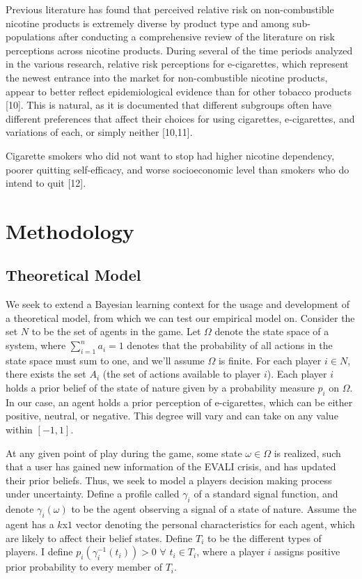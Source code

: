 \documentclass[12pt]{article}
\begin{document}
Previous literature has found that perceived relative risk on non-combustible nicotine products is extremely diverse by product type and among sub-populations after conducting a comprehensive review of the literature on risk perceptions across nicotine products. During several of the time periods analyzed in the various research, relative risk perceptions for e-cigarettes, which represent the newest entrance into the market for non-combustible nicotine products, appear to better reflect epidemiological evidence than for other tobacco products [10]. This is natural, as it is documented that different subgroups often have different preferences that affect their choices for using cigarettes, e-cigarettes, and variations of each, or simply neither [10,11].

Cigarette smokers who did not want to stop had higher nicotine dependency, poorer quitting self-efficacy, and worse socioeconomic level than smokers who do intend to quit [12].



\section{Methodology} \label{sec:methodology}


\subsection{Theoretical Model}
\hspace{5mm}We seek to extend a Bayesian learning context for the usage and development of a theoretical model, from which we can test our empirical model on. Consider the set $N$ to be the set of agents in the game. Let $\Omega$ denote the state space of a system, where $\sum\limits_{i=1}^{n}a_i=1$ denotes that the probability of all actions in the state space must sum to one, and we'll assume $\Omega$ is finite. For each player $i\in N$, there exists the set $A_i$ (the set of actions available to player $i$). Each player $i$ holds a prior belief of the state of nature given by a probability measure $p_i$ on $\Omega$. In our case, an agent holds a prior perception of e-cigarettes, which can be either positive, neutral, or negative. This degree will vary and can take on any value within $[-1,1]$. 

At any given point of play during the game, some state $\omega\in\Omega$ is realized, such that a user has gained new information of the EVALI crisis, and has updated their prior beliefs. Thus, we seek to model a players decision making process under uncertainty. Define a profile called $\gamma_i$ of a standard signal function, and denote $\gamma_i(\omega)$ to be the agent observing a signal of a state of nature. Assume the agent has a $k$x$1$ vector denoting the personal characteristics for each agent, which are likely to affect their belief states. Define $T_i$ to be the different types of players. I define $p_i(\gamma_i^{-1}(t_i))>0$ $\forall$ $t_i\in T_i$, where a player $i$ assigns positive prior probability to every member of $T_i$.
\end{document}
